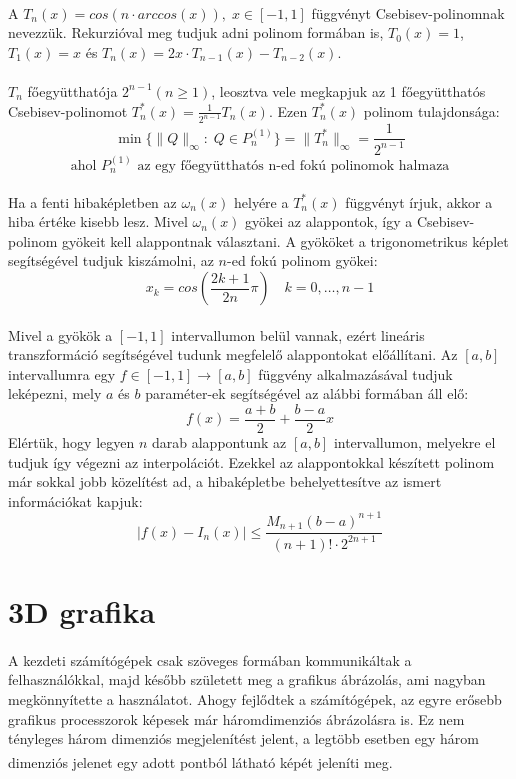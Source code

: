 \documentclass[12pt]{report}
\begin{document}
\paragraph{}
A $T_n(x) = cos(n \cdot arccos(x)), \; x \in [-1, 1]$ függvényt Csebisev-polinomnak nevezzük. Rekurzióval meg tudjuk adni polinom formában is, $T_0(x)=1$, $T_1(x) = x$ és $T_n(x) = 2x \cdot  T_{n-1}(x)-T_{n-2}(x)$.
\paragraph{}
$T_n$ főegyütthatója $2^{n-1} (n \geq 1)$, leosztva vele megkapjuk az 1 főegyütthatós Csebisev-polinomot $T^*_n(x) = \frac{1}{2^{n-1}} T_n(x)$.
Ezen $T^*_n(x)$ polinom tulajdonsága:
$$
\min\{ \|Q\|_\infty : \; Q \in P^{(1)}_n\} = \|T^*_n\|_\infty = \frac{1}{2^{n-1}}
$$
$$
\mbox{ahol } P^{(1)}_n \mbox{ az egy főegyütthatós n-ed fokú polinomok halmaza}
$$
\paragraph{}
Ha a fenti hibaképletben az $\omega_n(x)$ helyére a $T^*_n(x)$ függvényt írjuk, akkor a hiba értéke kisebb lesz. Mivel $\omega_n(x)$ gyökei az alappontok, így a Csebisev-polinom gyökeit kell alappontnak választani. A gyököket a  trigonometrikus képlet segítségével tudjuk kiszámolni, az $n$-ed fokú polinom gyökei:
$$
x_k = cos(\frac{2 k + 1}{2 n} \pi) \quad k = 0, \dots , n-1
$$
\paragraph{}
Mivel a gyökök a $[-1, 1]$ intervallumon belül vannak, ezért lineáris transzformáció segítségével tudunk megfelelő alappontokat előállítani. Az $[a,b]$ intervallumra egy $f \in [-1,1] \rightarrow [a,b]$ függvény alkalmazásával tudjuk leképezni, mely $a$ és $b$ paraméter-ek segítségével az alábbi formában áll elő:
$$
f(x) = \frac{a+b}{2}+\frac{b-a}{2} x
$$
Elértük, hogy legyen $n$ darab alappontunk az $[a,b]$ intervallumon, melyekre el tudjuk így végezni az interpolációt. Ezekkel az alappontokkal készített polinom már sokkal jobb közelítést ad, a hibaképletbe behelyettesítve az ismert információkat kapjuk:
$$
|f(x)-I_n(x)| \leq \frac{M_{n+1}(b-a)^{n+1}}{(n+1)! \cdot 2^{2n+1}}
$$

\section{3D grafika}
\paragraph{}
A kezdeti számítógépek csak szöveges formában kommunikáltak a felhasználókkal, majd később született meg a grafikus ábrázolás, ami nagyban megkönnyítette a használatot. Ahogy fejlődtek a számítógépek, az egyre erősebb grafikus processzorok képesek már háromdimenziós ábrázolásra is. Ez nem tényleges három dimenziós megjelenítést jelent, a legtöbb esetben egy három dimenziós jelenet egy adott pontból látható képét jeleníti meg\textsuperscript{\cite{szamgraf}}.
\end{document}
